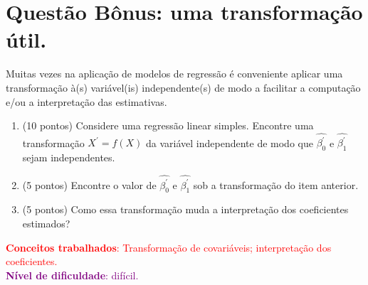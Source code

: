 \documentclass[a4paper,10pt, notitlepage]{report}
\begin{document}
\section*{Questão Bônus: uma transformação útil.} 

Muitas vezes na aplicação de modelos de regressão é conveniente aplicar uma transformação à(s) variável(is) independente(s) de modo a facilitar a computação e/ou a interpretação das estimativas.

\begin{enumerate}[label=\alph*)]
 \item (10 pontos)  Considere uma regressão linear simples.
 Encontre  uma transformação $X^\prime = f(X)$ da variável independente de modo que $\hat{\beta_0^\prime}$ e $\hat{\beta_1^\prime}$ sejam independentes. 
 \item (5 pontos) Encontre o valor de $\hat{\beta_0^\prime}$ e $\hat{\beta_1^\prime}$ sob a transformação do item anterior.
 \item (5 pontos) Como essa transformação muda a interpretação dos coeficientes estimados? 
\end{enumerate}
\textcolor{red}{\textbf{Conceitos trabalhados}: Transformação de covariáveis; interpretação dos coeficientes.}\\
\textcolor{purple}{\textbf{Nível de dificuldade}: difícil.}\\
\end{document}
